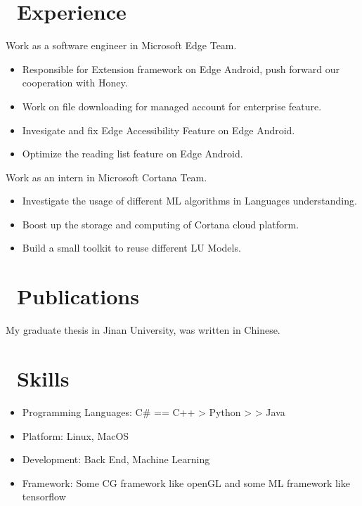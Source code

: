 \documentclass{resume}
\begin{document}
\section{\faUsers\ Experience}

Work as a software engineer in Microsoft Edge Team.
\begin{itemize}
    \item Responsible for Extension framework on Edge Android, push forward our cooperation with Honey.
    \item Work on file downloading for managed account for enterprise feature.
    \item Invesigate and fix Edge Accessibility Feature on Edge Android.
    \item Optimize the reading list feature on Edge Android.
\end{itemize}

Work as an intern in Microsoft Cortana Team.
\begin{itemize}
    \item Investigate the usage of different ML algorithms in Languages understanding.
    \item Boost up the storage and computing of Cortana cloud platform.
    \item Build a small toolkit to reuse different LU Models.
\end{itemize}

\section{\faCogs\ Publications}
My graduate thesis in Jinan University, was written in Chinese.

\section{\faCogs\ Skills}
\begin{itemize}[parsep=0.5ex]
  \item Programming Languages: C\# == C++ > Python > > Java
  \item Platform: Linux, MacOS
  \item Development: Back End, Machine Learning
	\item Framework: Some CG framework like openGL and some ML framework like tensorflow
\end{itemize}
\end{document}
